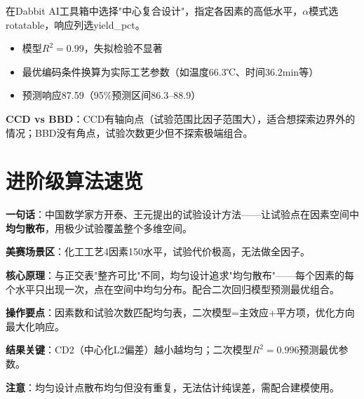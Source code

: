 \begin{algosposs}
在Dabbit AI工具箱中选择"中心复合设计"，指定各因素的高低水平，$\alpha$模式选rotatable，响应列选yield\_pct。
\end{algosposs}

\begin{algoresult}
\begin{itemize}
    \item 模型$R^2=0.99$，失拟检验不显著
    \item 最优编码条件换算为实际工艺参数（如温度66.3℃、时间36.2min等）
    \item 预测响应87.59（95\%预测区间86.3--88.9）
\end{itemize}
\end{algoresult}

\begin{algonotes}
\textbf{CCD vs BBD}：CCD有轴向点（试验范围比因子范围大），适合想探索边界外的情况；BBD没有角点，试验次数更少但不探索极端组合。
\end{algonotes}

\section{进阶级算法速览}


\begin{algobrief}
\textbf{一句话}：中国数学家方开泰、王元提出的试验设计方法——让试验点在因素空间中\textbf{均匀散布}，用极少试验覆盖整个多维空间。

\textbf{美赛场景区}：化工工艺4因素150水平，试验代价极高，无法做全因子。

\textbf{核心原理}：与正交表"整齐可比"不同，均匀设计追求"均匀散布"——每个因素的每个水平只出现一次，点在空间中均匀分布。配合二次回归模型预测最优组合。

\textbf{操作要点}：因素数和试验次数匹配均匀表，二次模型=主效应+平方项，优化方向最大化响应。

\textbf{结果关键}：CD2（中心化L2偏差）越小越均匀；二次模型$R^2=0.996$预测最优参数。

\textbf{注意}：均匀设计点散布均匀但没有重复，无法估计纯误差，需配合建模使用。
\end{algobrief}


